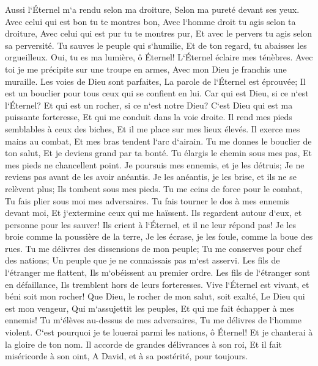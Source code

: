 \verse Aussi l`Éternel m`a rendu selon ma droiture, Selon ma pureté devant ses yeux. 
\verse Avec celui qui est bon tu te montres bon, Avec l`homme droit tu agis selon ta droiture, 
\verse Avec celui qui est pur tu te montres pur, Et avec le pervers tu agis selon sa perversité. 
\verse Tu sauves le peuple qui s`humilie, Et de ton regard, tu abaisses les orgueilleux. 
\verse Oui, tu es ma lumière, ô Éternel! L`Éternel éclaire mes ténèbres. 
\verse Avec toi je me précipite sur une troupe en armes, Avec mon Dieu je franchis une muraille. 
\verse Les voies de Dieu sont parfaites, La parole de l`Éternel est éprouvée; Il est un bouclier pour tous ceux qui se confient en lui. 
\verse Car qui est Dieu, si ce n`est l`Éternel? Et qui est un rocher, si ce n`est notre Dieu? 
\verse C`est Dieu qui est ma puissante forteresse, Et qui me conduit dans la voie droite. 
\verse Il rend mes pieds semblables à ceux des biches, Et il me place sur mes lieux élevés. 
\verse Il exerce mes mains au combat, Et mes bras tendent l`arc d`airain. 
\verse Tu me donnes le bouclier de ton salut, Et je deviens grand par ta bonté. 
\verse Tu élargis le chemin sous mes pas, Et mes pieds ne chancellent point. 
\verse Je poursuis mes ennemis, et je les détruis; Je ne reviens pas avant de les avoir anéantis. 
\verse Je les anéantis, je les brise, et ils ne se relèvent plus; Ils tombent sous mes pieds. 
\verse Tu me ceins de force pour le combat, Tu fais plier sous moi mes adversaires. 
\verse Tu fais tourner le dos à mes ennemis devant moi, Et j`extermine ceux qui me haïssent. 
\verse Ils regardent autour d`eux, et personne pour les sauver! Ils crient à l`Éternel, et il ne leur répond pas! 
\verse Je les broie comme la poussière de la terre, Je les écrase, je les foule, comme la boue des rues. 
\verse Tu me délivres des dissensions de mon peuple; Tu me conserves pour chef des nations; Un peuple que je ne connaissais pas m`est asservi. 
\verse Les fils de l`étranger me flattent, Ils m`obéissent au premier ordre. 
\verse Les fils de l`étranger sont en défaillance, Ils tremblent hors de leurs forteresses. 
\verse Vive l`Éternel est vivant, et béni soit mon rocher! Que Dieu, le rocher de mon salut, soit exalté, 
\verse Le Dieu qui est mon vengeur, Qui m`assujettit les peuples, 
\verse Et qui me fait échapper à mes ennemis! Tu m`élèves au-dessus de mes adversaires, Tu me délivres de l`homme violent. 
\verse C`est pourquoi je te louerai parmi les nations, ô Éternel! Et je chanterai à la gloire de ton nom. 
\verse Il accorde de grandes délivrances à son roi, Et il fait miséricorde à son oint, A David, et à sa postérité, pour toujours. 

